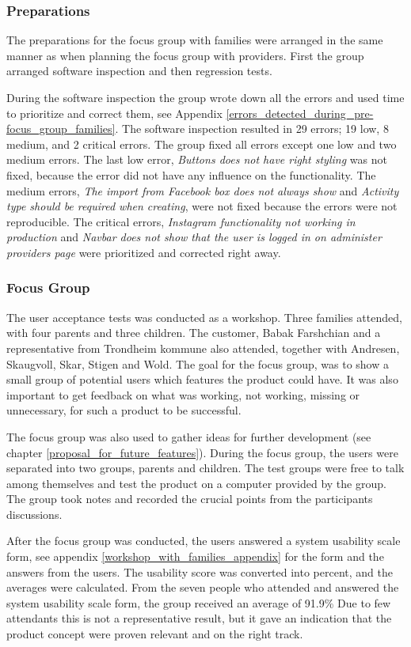 \subsubsection{Preparations}
The preparations for the focus group with families were arranged in the same manner as when planning the focus group with providers. First the group arranged software inspection and then regression tests.

During the software inspection the group wrote down all the errors and used time to prioritize and correct them, see Appendix \ref{errors_detected_during_pre-focus_group_families}. The software inspection resulted in 29 errors; 19 low, 8 medium, and 2 critical errors. The group fixed all errors except one low and two medium errors. The last low error, \textit{Buttons does not have right styling} was not fixed, because the error did not have any influence on the functionality. The medium errors, \textit{The import from Facebook box does not always show} and \textit{Activity type should be required when creating}, were not fixed because the errors were not reproducible. The critical errors, \textit{Instagram functionality not working in production} and \textit{Navbar does not show that the user is logged in on administer providers page} were prioritized and corrected right away.


\subsubsection{Focus Group}
\label{focusGroup}
The user acceptance tests was conducted as a workshop. Three families attended, with four parents and three children. The customer, Babak Farshchian and a representative from Trondheim kommune also attended, together with Andresen, Skaugvoll, Skar, Stigen and Wold. The goal for the focus group, was to show a small group of potential users which features the product could have. It was also important to get feedback on what was working, not working, missing or unnecessary, for such a product to be successful.

The focus group was also used to gather ideas for further development (see chapter \ref{proposal_for_future_features}). During the focus group, the users were separated into two groups, parents and children. The test groups were free to talk among themselves and test the product on a computer provided by the group. The group took notes and recorded the crucial points from the participants discussions.

After the focus group was conducted, the users answered a system usability scale form, see appendix \ref{workshop_with_families_appendix} for the form and the answers from the users. The usability score was converted into percent, and the averages were calculated. From the seven people who attended and answered the system usability scale form, the group received an average of 91.9\% Due to few attendants this is not a representative result, but it gave an indication that the product concept were proven relevant and on the right track.

